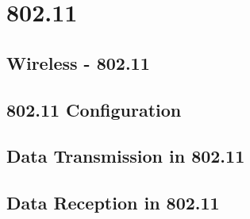 \section{802.11}

\subsection{Wireless - 802.11}

\subsection{802.11 Configuration}

\subsection{Data Transmission in 802.11}

\subsection{Data Reception in 802.11}


